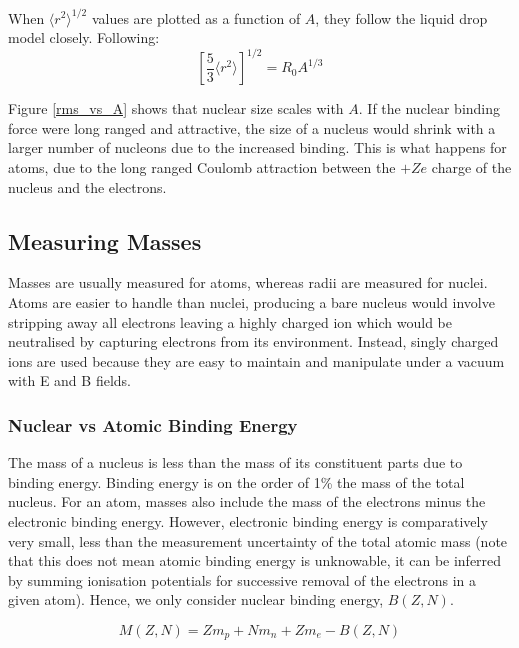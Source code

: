 When \(\langle r^2 \rangle ^{1/2}\) values are plotted as a function of \(A\), they follow the liquid drop model closely. Following:
\[\left[\frac{5}{3}\langle r^2\rangle\right]^{1/2}=R_0 A^{1/3}\]



Figure \ref{rms_vs_A} shows that nuclear size scales with \(A\). If the nuclear binding force were long ranged and attractive, the size of a nucleus would shrink with a larger number of nucleons due to the increased binding. This is what happens for atoms, due to the long ranged Coulomb attraction between the \(+Ze\) charge of the nucleus and the electrons. 

\subsection{Measuring Masses}
Masses are usually measured for atoms, whereas radii are measured for nuclei. Atoms are easier to handle than nuclei, producing a bare nucleus would involve stripping away all electrons leaving a highly charged ion which would be neutralised by capturing electrons from its environment. Instead, singly charged ions are used because they are easy to maintain and manipulate under a vacuum with E and B fields. 

\subsubsection*{Nuclear vs Atomic Binding Energy}
The mass of a nucleus is less than the mass of its constituent parts due to binding energy. Binding energy is on the order of 1\% the mass of the total nucleus. For an atom, masses also include the mass of the electrons minus the electronic binding energy. However, electronic binding energy is comparatively very small, less than the measurement uncertainty of the total atomic mass (note that this does not mean atomic binding energy is unknowable, it can be inferred by summing ionisation potentials for successive removal of the electrons in a given atom). Hence, we only consider nuclear binding energy, \(B(Z, N)\).

\[M(Z, N) = Zm_p + Nm_n + Zm_e - B(Z, N)\]

